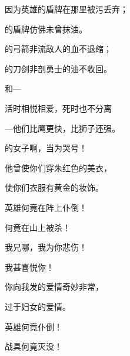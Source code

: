 {\par }{\Q 因为英雄的盾牌在那里被污丢弃；
\par }{的盾牌仿佛未曾抹油。
\par }{\BB \par }{\Q {}的弓箭非流敌人的血不退缩；
\par }{的刀剑非剖勇士的油不收回。
\par }{\BB \par }{\Q {}和{}—
\par }{\Q 活时相悦相爱，死时也不分离
\par }{\Q —他们比鹰更快，比狮子还强。
\par }{\BB \par }{\Q {}的女子啊，当为{}哭号！
\par }{\Q 他曾使你们穿朱红色的美衣，
\par }{\Q 使你们衣服有黄金的妆饰。
\par }{\BB \par }{\Q {}英雄何竟在阵上仆倒！
\par }{何竟在山上被杀！
\par }{\Q {}我兄{}哪，我为你悲伤！
\par }{\Q 我甚喜悦你！
\par }{\Q 你向我发的爱情奇妙非常，
\par }{\Q 过于妇女的爱情。
\par }{\BB \par }{\Q {}英雄何竟仆倒！
\par }{\Q 战具何竟灭没！

}
